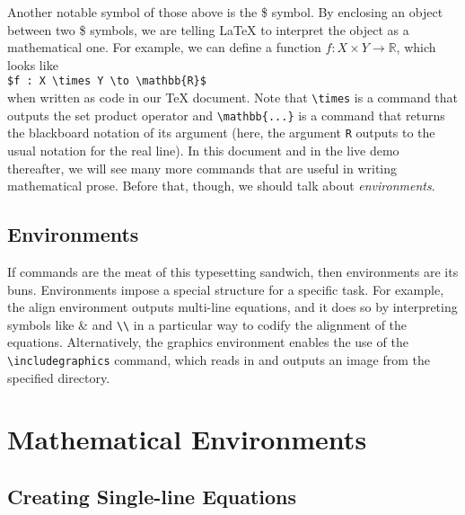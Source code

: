 \documentclass[12pt]{article}	%
\begin{document}
Another notable symbol of those above is the \$ symbol. By enclosing an object between two \$ symbols, we are telling \LaTeX{} to interpret the object as a mathematical one. For example, we can define a function $f : X \times Y \to \mathbb{R}$, which looks like \\

	\verb!$f : X \times Y \to \mathbb{R}$! \\

\noindent when written as code in our TeX document. Note that \verb!\times! is a command that outputs the set product operator and \verb!\mathbb{...}! is a command that returns the blackboard notation of its argument (here, the argument \verb!R! outputs to the usual notation for the real line). In this document and in the live demo thereafter, we will see many more commands that are useful in writing mathematical prose. Before that, though, we should talk about {\it environments}.

\subsection{Environments}

If commands are the meat of this typesetting sandwich, then environments are its buns. Environments impose a special structure for a specific task. For example, the align environment outputs multi-line equations, and it does so by interpreting symbols like \& and \verb!\\! in a particular way to codify the alignment of the equations. Alternatively, the graphics environment enables the use of the \verb!\includegraphics! command, which reads in and outputs an image from the specified directory.


\newpage
\section{Mathematical Environments}

\subsection{Creating Single-line Equations}
\end{document}
